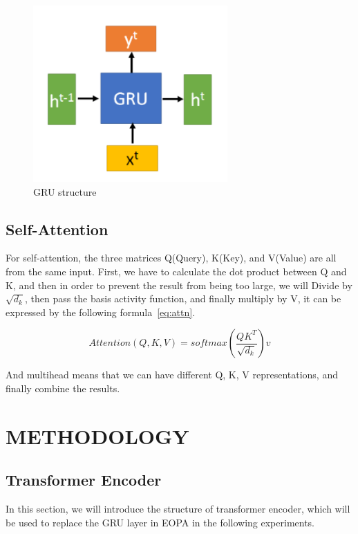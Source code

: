 \documentclass{article}
\begin{document}
\begin{figure}
    \centering
    \includegraphics[scale=0.5]{gru}
    \caption{GRU structure}
    \label{fig:gru}
\end{figure}

\subsection{Self-Attention}

For self-attention, the three matrices Q(Query), K(Key), and V(Value) are
all from the same input. First, we have to calculate the dot product
between Q and K, and then in order to prevent the result
from being too large, we will Divide by $\sqrt{d_k}$,
then pass the basis activity function, and finally multiply by V,
it can be expressed by the following formula~\ref{eq:attn}.

\begin{equation}
    \label{eq:attn}
    Attention(Q,K,V)=softmax(\frac{QK^{T}}{\sqrt{d_{k}}})v
\end{equation}

And multihead means that we can have different Q, K, V representations,
and finally combine the results.


\section{METHODOLOGY}

\subsection{Transformer Encoder}

In this section, we will introduce the structure of transformer encoder,
which will be used to replace the GRU layer in EOPA
in the following experiments.
\end{document}

